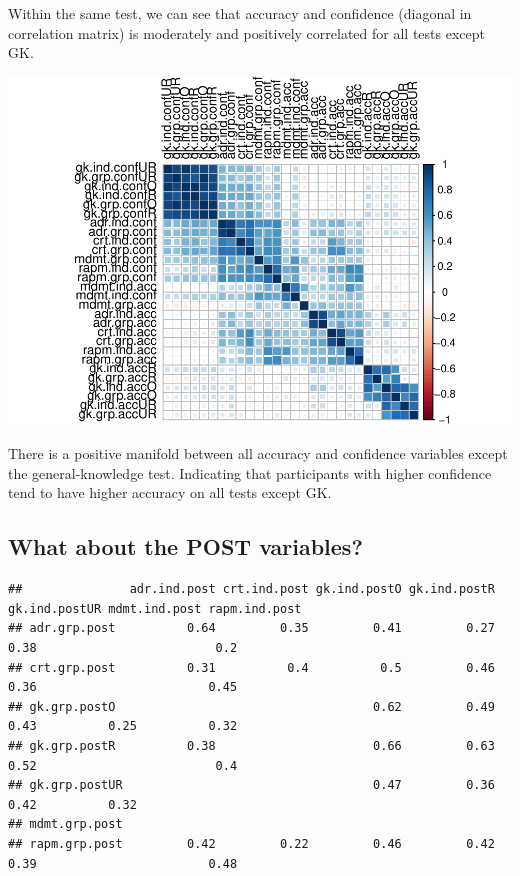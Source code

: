 \documentclass[]{article}
\begin{document}
Within the same test, we can see that accuracy and confidence (diagonal
in correlation matrix) is moderately and positively correlated for all
tests except GK.

\includegraphics{corr_analyses_files/figure-latex/acc-conf2-1.pdf}

There is a positive manifold between all accuracy and confidence
variables except the general-knowledge test. Indicating that
participants with higher confidence tend to have higher accuracy on all
tests except GK.

\subsection{What about the POST
variables?}\label{what-about-the-post-variables}

\begin{verbatim}
##               adr.ind.post crt.ind.post gk.ind.postO gk.ind.postR gk.ind.postUR mdmt.ind.post rapm.ind.post
## adr.grp.post          0.64         0.35         0.41         0.27          0.38                         0.2
## crt.grp.post          0.31          0.4          0.5         0.46          0.36                        0.45
## gk.grp.postO                                    0.62         0.49          0.43          0.25          0.32
## gk.grp.postR          0.38                      0.66         0.63          0.52                         0.4
## gk.grp.postUR                                   0.47         0.36          0.42          0.32              
## mdmt.grp.post                                                                                              
## rapm.grp.post         0.42         0.22         0.46         0.42          0.39                        0.48
\end{verbatim}
\end{document}

